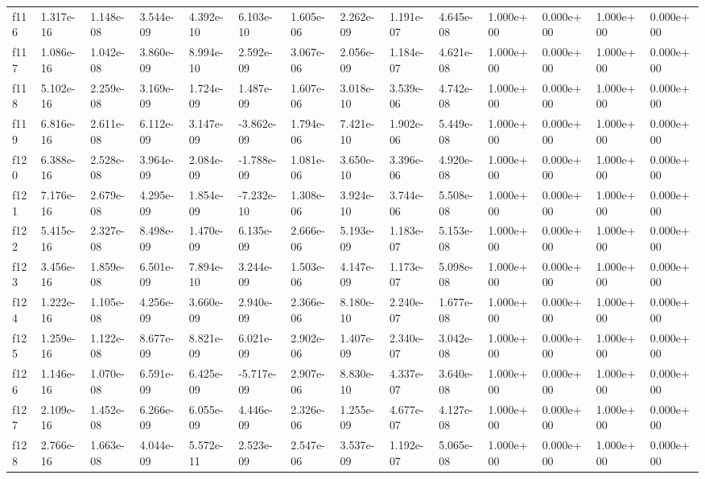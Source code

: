 \begin{table}
\begin{tabular}{llllllllllllll}
f116 & 1.317e-16 & 1.148e-08 & 3.544e-09 & 4.392e-10 & 6.103e-10 & 1.605e-06 & 2.262e-09 & 1.191e-07 & 4.645e-08 & 1.000e+00 & 0.000e+00 & 1.000e+00 & 0.000e+00 \\
f117 & 1.086e-16 & 1.042e-08 & 3.860e-09 & 8.994e-10 & 2.592e-09 & 3.067e-06 & 2.056e-09 & 1.184e-07 & 4.621e-08 & 1.000e+00 & 0.000e+00 & 1.000e+00 & 0.000e+00 \\
f118 & 5.102e-16 & 2.259e-08 & 3.169e-09 & 1.724e-09 & 1.487e-09 & 1.607e-06 & 3.018e-10 & 3.539e-06 & 4.742e-08 & 1.000e+00 & 0.000e+00 & 1.000e+00 & 0.000e+00 \\
f119 & 6.816e-16 & 2.611e-08 & 6.112e-09 & 3.147e-09 & -3.862e-09 & 1.794e-06 & 7.421e-10 & 1.902e-06 & 5.449e-08 & 1.000e+00 & 0.000e+00 & 1.000e+00 & 0.000e+00 \\
f120 & 6.388e-16 & 2.528e-08 & 3.964e-09 & 2.084e-09 & -1.788e-09 & 1.081e-06 & 3.650e-10 & 3.396e-06 & 4.920e-08 & 1.000e+00 & 0.000e+00 & 1.000e+00 & 0.000e+00 \\
f121 & 7.176e-16 & 2.679e-08 & 4.295e-09 & 1.854e-09 & -7.232e-10 & 1.308e-06 & 3.924e-10 & 3.744e-06 & 5.508e-08 & 1.000e+00 & 0.000e+00 & 1.000e+00 & 0.000e+00 \\
f122 & 5.415e-16 & 2.327e-08 & 8.498e-09 & 1.470e-09 & 6.135e-09 & 2.666e-06 & 5.193e-09 & 1.183e-07 & 5.153e-08 & 1.000e+00 & 0.000e+00 & 1.000e+00 & 0.000e+00 \\
f123 & 3.456e-16 & 1.859e-08 & 6.501e-09 & 7.894e-10 & 3.244e-09 & 1.503e-06 & 4.147e-09 & 1.173e-07 & 5.098e-08 & 1.000e+00 & 0.000e+00 & 1.000e+00 & 0.000e+00 \\
f124 & 1.222e-16 & 1.105e-08 & 4.256e-09 & 3.660e-09 & 2.940e-09 & 2.366e-06 & 8.180e-10 & 2.240e-07 & 1.677e-08 & 1.000e+00 & 0.000e+00 & 1.000e+00 & 0.000e+00 \\
f125 & 1.259e-16 & 1.122e-08 & 8.677e-09 & 8.821e-09 & 6.021e-09 & 2.902e-06 & 1.407e-09 & 2.340e-07 & 3.042e-08 & 1.000e+00 & 0.000e+00 & 1.000e+00 & 0.000e+00 \\
f126 & 1.146e-16 & 1.070e-08 & 6.591e-09 & 6.425e-09 & -5.717e-09 & 2.907e-06 & 8.830e-10 & 4.337e-07 & 3.640e-08 & 1.000e+00 & 0.000e+00 & 1.000e+00 & 0.000e+00 \\
f127 & 2.109e-16 & 1.452e-08 & 6.266e-09 & 6.055e-09 & 4.446e-09 & 2.326e-06 & 1.255e-09 & 4.677e-07 & 4.127e-08 & 1.000e+00 & 0.000e+00 & 1.000e+00 & 0.000e+00 \\
f128 & 2.766e-16 & 1.663e-08 & 4.044e-09 & 5.572e-11 & 2.523e-09 & 2.547e-06 & 3.537e-09 & 1.192e-07 & 5.065e-08 & 1.000e+00 & 0.000e+00 & 1.000e+00 & 0.000e+00 \\

\end{tabular}
\end{table}
